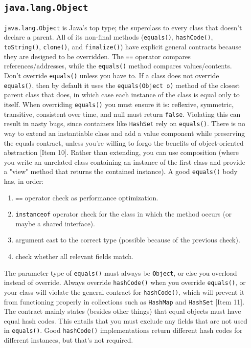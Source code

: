 \documentclass[table, xcdraw]{article}%
\begin{document}
\subsection{\texttt{java.lang.Object}}

\texttt{java.lang.Object} is Java's top type; the superclass to every class that doesn't declare a parent. All of its non-final methods (\texttt{equals()}, \texttt{hashCode()}, \texttt{toString()}, \texttt{clone()}, and \texttt{finalize()}) have explicit general contracts because they are designed to be overridden. The \texttt{==} operator compares references/addresses, while the \texttt{equals()} method compares values/contents. Don't override \texttt{equals()} unless you have to. If a class does not override \texttt{equals()}, then by default it uses the \texttt{equals(Object o)} method of the closest parent class that does, in which case each instance of the class is equal only to itself. When overriding \texttt{equals()} you must ensure it is: reflexive, symmetric, transitive, consistent over time, and null must return \texttt{false}. Violating this can result in nasty bugs, since containers like \texttt{HashSet} rely on \texttt{equals()}. There is no way to extend an instantiable class and add a value component while preserving the equals contract, unless you're willing to forgo the benefits of object-oriented abstraction [Item 10]. Rather than extending, you can use composition (where you write an unrelated class containing an instance of the first class and provide a "view" method that returns the contained instance). A good \texttt{equals()} body has, in order:

\begin{enumerate}
    \item \texttt{==} operator check as performance optimization.
    \item \texttt{instanceof} operator check for the  class in which the method occurs (or maybe a shared interface).
    \item argument cast to the correct type (possible because of the previous check).
    \item check whether all relevant fields match.
\end{enumerate}

The parameter type of \texttt{equals()} must always be \texttt{Object}, or else you overload instead of override. Always override \texttt{hashCode()} when you override \texttt{equals()}, or your class will violate the general contract for \texttt{hashCode()}, which will prevent it from functioning properly in collections such as \texttt{HashMap} and \texttt{HashSet} [Item 11]. The contract mainly states (besides other things) that equal objects must have equal hash codes. This entails that you must exclude any fields that are not used in \texttt{equals()}. Good \texttt{hashCode()} implementations return different hash codes for different instances, but that's not required.
\end{document}
